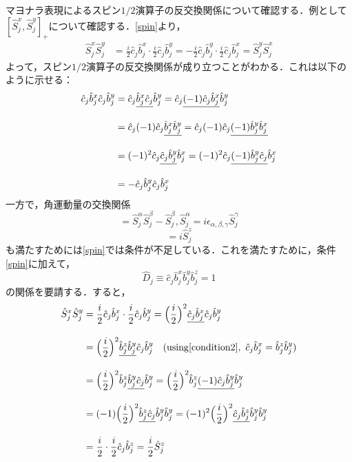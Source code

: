 \documentclass[dvipdfmx,autodetect-engine]{jsarticle}
\newcommand{\nn}{\notag \\}
\begin{document}
マヨナラ表現によるスピン$1/2$演算子の反交換関係について確認する．例として$[\hat{S}^{x}_j,\hat{S}^y_j]_+$について確認する．\eqref{spin}より，
\begin{align}
    \hat{S}^{x}_j\hat{S}^y_j
    &=\frac{i}{2} \hat{c}_j\hat{b}^{x}_j\cdot
    \frac{i}{2} \hat{c}_j\hat{b}^{y}_j
    =-\frac{i}{2} \hat{c}_j\hat{b}^{y}_j\cdot
    \frac{i}{2} \hat{c}_j\hat{b}^{x}_j
    =\hat{S}^{y}_j\hat{S}^x_j
\end{align}
よって，スピン$1/2$演算子の反交換関係が成り立つことがわかる．これは以下のように示せる：
\begin{align}
    \hat{c}_j\hat{b}^{x}_j
    \hat{c}_j\hat{b}^{y}_j
    &=\hat{c}_j\uline{\hat{b}^{x}_j\hat{c}_j}
    \hat{b}^{y}_j
    =\hat{c}_j\uline{(-1)\hat{c}_j\hat{b}^{x}_j}
    \hat{b}^{y}_j\nn[10pt]
    &
    =\hat{c}_j(-1)\hat{c}_j\uline{\hat{b}^{x}_j\hat{b}^{y}_j}
    =\hat{c}_j(-1)\hat{c}_j\uline{(-1)\hat{b}^{y}_j\hat{b}^{x}_j}
    \nn[10pt]
    &
    =(-1)^2\hat{c}_j\uline{\hat{c}_j\hat{b}^{y}_j}\hat{b}^{x}_j
    =(-1)^2\hat{c}_j\uline{(-1)\hat{b}^{y}_j\hat{c}_j}\hat{b}^{x}_j
    \nn[10pt]
    &=-\hat{c}_j\hat{b}^{y}_j\hat{c}_j\hat{b}^{x}_j
\end{align}
一方で，角運動量の交換関係
\begin{equation}
    [\hat{S}^{\alpha}_j,\hat{S}^{\beta}_j]
    =\hat{S}^{\alpha}_j\hat{S}^{\beta}_j
    -\hat{S}^{\beta}_j,\hat{S}^{\alpha}_j
    =i\epsilon_{\alpha,\beta,\gamma}\hat{S}^{\gamma}_j
\end{equation}
\begin{equation}
    [\hat{S}^{x}_j,\hat{S}^{y}_j]
    =i\hat{S}^{z}_j
\end{equation}
も満たすためには\eqref{spin}では条件が不足している．これを満たすために，条件\eqref{spin}に加えて，
\begin{equation}\label{condition2}
    \hat{D}_j \equiv \hat{c}_j\hat{b}_j^x\hat{b}_j^y\hat{b}_j^z =1
\end{equation}
の関係を要請する．すると，
\begin{align}
    \hat{S}_j^{x}\hat{S}_j^{y}
    &=\frac{i}{2} \hat{c}_j\hat{b}_j^{x} \cdot \frac{i}{2} \hat{c}_j\hat{b}_j^{y}
    =\Bigl(\frac{i}{2}\Bigr)^2
    \uline{\hat{c}_j\hat{b}_j^{x}}\hat{c}_j\hat{b}_j^{y}\nn[10pt]
    &=\Bigl(\frac{i}{2}\Bigr)^2
    \uline{\hat{b}_j^z\hat{b}_j^y}\hat{c}_j\hat{b}_j^{y}\ \ \ 
    ({\rm{using \eqref{condition2}}},\  \hat{c}_j\hat{b}_j^x=\hat{b}_j^z\hat{b}_j^y)\nn[10pt]
    &=\Bigl(\frac{i}{2}\Bigr)^2
    \hat{b}_j^z\uline{\hat{b}_j^y\hat{c}_j}\hat{b}_j^{y}
    =\Bigl(\frac{i}{2}\Bigr)^2
    \hat{b}_j^z\uline{(-1)\hat{c}_j\hat{b}_j^y}\hat{b}_j^{y}
    \nn[10pt]
    &=(-1)\Bigl(\frac{i}{2}\Bigr)^2
    \uline{\hat{b}_j^z\hat{c}_j}\hat{b}_j^y\hat{b}_j^{y}
    =(-1)^2\Bigl(\frac{i}{2}\Bigr)^2
    \uline{\hat{c}_j\hat{b}_j^z}\hat{b}_j^y\hat{b}_j^{y}
    \nn[10pt]
    &=\frac{i}{2}\cdot\frac{i}{2}
    \hat{c}_j\hat{b}_j^z
    =\frac{i}{2}\hat{S}_j^z
\end{align}
\end{document}
